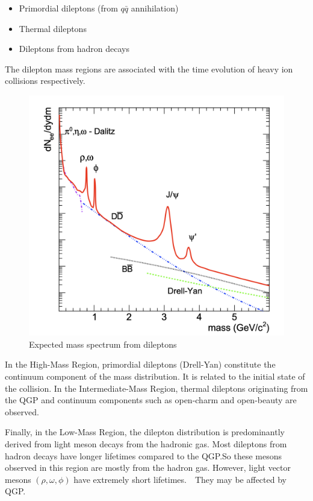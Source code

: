         \begin{itemize}
            \item Primordial dileptons (from \(q\bar{q}\) annihilation)
            \item Thermal dileptons
            \item Dileptons from hadron decays
        \end{itemize} 
        The dilepton mass regions are associated with the time evolution of heavy ion collisions respectively.
        \begin{figure}[hbtp]
            \centering
            \includegraphics[keepaspectratio, scale=0.3]{fig/1_6_expected_dileptonMass.png}
            \caption{Expected mass spectrum from dileptons\cite{Rapp:1999ej}}
            \label{Intro:Dilepton:dilepton_mass}
        \end{figure}
        
        In the High-Mass Region, primordial dileptons (Drell-Yan) constitute the continuum component of the mass distribution. It is related to the initial state of the collision. In the Intermediate-Mass Region, thermal dileptons originating from the QGP and continuum components such as open-charm and open-beauty are observed. 
        
        Finally, in the Low-Mass Region, the dilepton distribution is predominantly derived from light meson decays from the hadronic gas. Most dileptons from hadron decays have longer lifetimes compared to the QGP.\@ So these mesons observed in this region are mostly from the hadron gas. However, light vector mesons $(\rho, \omega, \phi)$ have extremely short lifetimes.　They may be affected by QGP.\@
